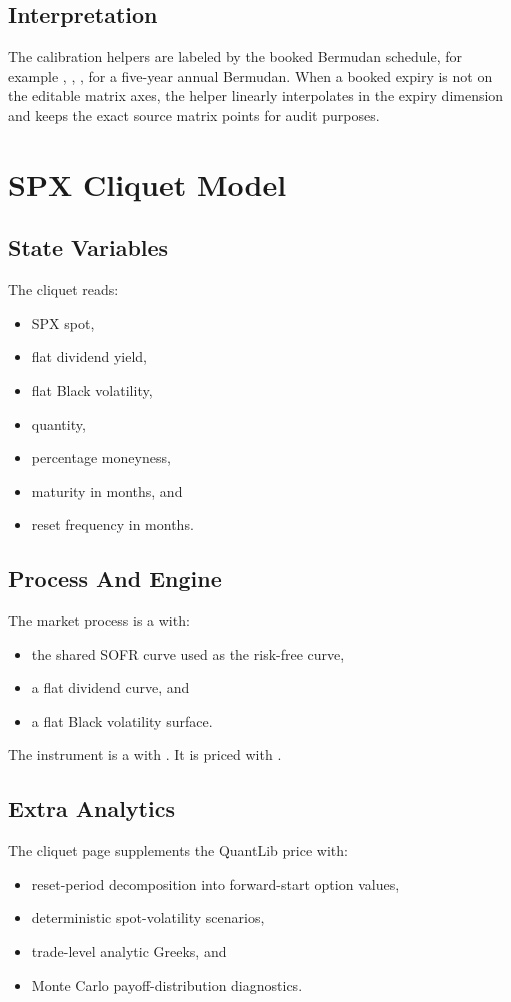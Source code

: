 \documentclass[conference]{IEEEtran}
\begin{document}
\subsection{Interpretation}
The calibration helpers are labeled by the booked Bermudan schedule, for example , , ,  for a five-year annual Bermudan. When a booked expiry is not on the editable matrix axes, the helper linearly interpolates in the expiry dimension and keeps the exact source matrix points for audit purposes.

\section{SPX Cliquet Model}
\subsection{State Variables}
The cliquet reads:
\begin{itemize}[leftmargin=1.5em]
    \item SPX spot,
    \item flat dividend yield,
    \item flat Black volatility,
    \item quantity,
    \item percentage moneyness,
    \item maturity in months, and
    \item reset frequency in months.
\end{itemize}

\subsection{Process And Engine}
The market process is a  with:
\begin{itemize}[leftmargin=1.5em]
    \item the shared SOFR curve used as the risk-free curve,
    \item a flat dividend curve, and
    \item a flat Black volatility surface.
\end{itemize}
The instrument is a  with
. It is priced with
.

\subsection{Extra Analytics}
The cliquet page supplements the QuantLib price with:
\begin{itemize}[leftmargin=1.5em]
    \item reset-period decomposition into forward-start option values,
    \item deterministic spot-volatility scenarios,
    \item trade-level analytic Greeks, and
    \item Monte Carlo payoff-distribution diagnostics.
\end{itemize}
\end{document}
